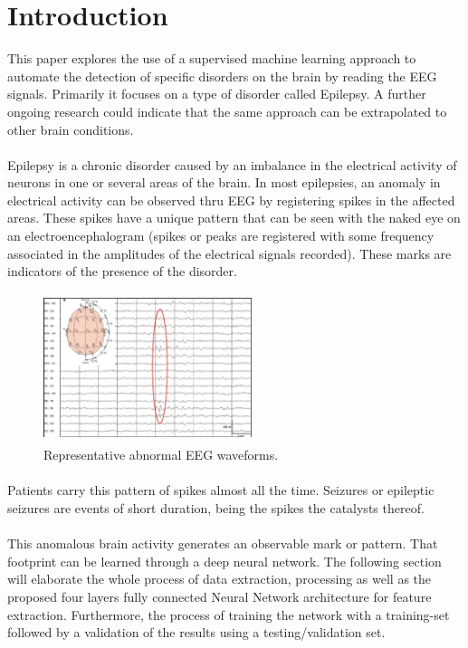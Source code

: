 \documentclass{llncs}       %
\begin{document}
\section{Introduction}
\label{intro}

This paper explores the use of a supervised machine learning approach to automate the detection of specific disorders on the brain by reading the EEG signals.  Primarily it focuses on a type of disorder called Epilepsy.  A further  ongoing research could indicate that  the same approach can be extrapolated to other brain conditions.
\paragraph{}
Epilepsy is a chronic disorder caused by an imbalance in the electrical activity of neurons in one or several areas of the brain. In most epilepsies, an anomaly in electrical activity can be observed thru  EEG by registering spikes in the affected areas. These spikes have a unique pattern that can be seen with the naked eye on an electroencephalogram (spikes or peaks are registered with some frequency associated in the amplitudes of the electrical signals recorded). These marks are indicators of the presence of the disorder.

\begin{figure}[h]
\centering
\includegraphics[width=6.08cm,height=4.36cm]{media/eeg-spike.eps}
\caption{Representative abnormal EEG waveforms.}
\end{figure}

\paragraph{}
Patients carry this pattern of spikes almost all the time. Seizures or epileptic seizures are events of short duration, being the spikes the catalysts thereof.
\paragraph{}
This anomalous brain activity generates an observable mark or pattern. That footprint can be learned through a deep neural network.  The following section will elaborate the whole process of data extraction, processing as well as the proposed four layers fully connected Neural Network architecture for feature extraction.  Furthermore, the process of training the network with a training-set followed by a validation of the results using a testing/validation set.
\end{document}

